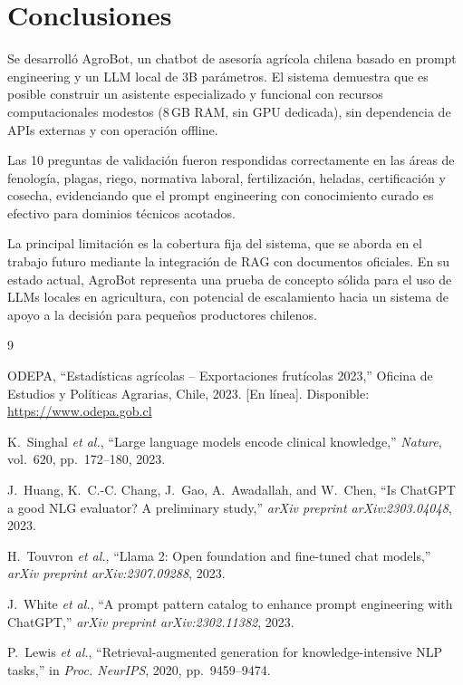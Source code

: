 \documentclass{IEEEtran}
\begin{document}
\section{Conclusiones}

Se desarrolló AgroBot, un chatbot de asesoría agrícola chilena basado en
prompt engineering y un LLM local de 3B parámetros.
El sistema demuestra que es posible construir un asistente especializado
y funcional con recursos computacionales modestos (8\,GB RAM, sin GPU dedicada),
sin dependencia de APIs externas y con operación offline.

Las 10 preguntas de validación fueron respondidas correctamente
en las áreas de fenología, plagas, riego, normativa laboral, fertilización,
heladas, certificación y cosecha, evidenciando que el prompt engineering
con conocimiento curado es efectivo para dominios técnicos acotados.

La principal limitación es la cobertura fija del sistema, que se aborda
en el trabajo futuro mediante la integración de RAG con documentos oficiales.
En su estado actual, AgroBot representa una prueba de concepto sólida para
el uso de LLMs locales en agricultura, con potencial de escalamiento hacia
un sistema de apoyo a la decisión para pequeños productores chilenos.

\begin{thebibliography}{9}

ODEPA,
``Estadísticas agrícolas -- Exportaciones frutícolas 2023,''
Oficina de Estudios y Políticas Agrarias, Chile, 2023.
[En línea]. Disponible: \url{https://www.odepa.gob.cl}

K.~Singhal \textit{et al.},
``Large language models encode clinical knowledge,''
\textit{Nature}, vol.~620, pp.~172--180, 2023.

J.~Huang, K.~C.-C. Chang, J.~Gao, A.~Awadallah, and W.~Chen,
``Is ChatGPT a good NLG evaluator? A preliminary study,''
\textit{arXiv preprint arXiv:2303.04048}, 2023.

H.~Touvron \textit{et al.},
``Llama 2: Open foundation and fine-tuned chat models,''
\textit{arXiv preprint arXiv:2307.09288}, 2023.

J.~White \textit{et al.},
``A prompt pattern catalog to enhance prompt engineering with ChatGPT,''
\textit{arXiv preprint arXiv:2302.11382}, 2023.

P.~Lewis \textit{et al.},
``Retrieval-augmented generation for knowledge-intensive NLP tasks,''
in \textit{Proc. NeurIPS}, 2020, pp.~9459--9474.

\end{thebibliography}
\end{document}
